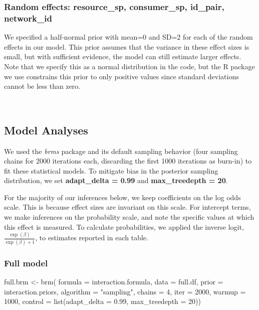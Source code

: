 \documentclass[11pt,]{article}
\newenvironment{Shaded}{}{}
\newcommand{\KeywordTok}[1]{\textcolor[rgb]{0.00,0.00,1.00}{#1}}
\newcommand{\DataTypeTok}[1]{#1}
\newcommand{\DecValTok}[1]{#1}
\newcommand{\FloatTok}[1]{#1}
\newcommand{\StringTok}[1]{\textcolor[rgb]{0.00,0.50,0.50}{#1}}
\newcommand{\NormalTok}[1]{#1}
\begin{document}
\subsubsection{Random effects: resource\_sp, consumer\_sp, id\_pair,
network\_id}\label{random-effects-resource_sp-consumer_sp-id_pair-network_id}

We specified a half-normal prior with mean=0 and SD=2 for each of the
random effects in our model. This prior assumes that the variance in
these effect sizes is small, but with sufficient evidence, the model can
still estimate larger effects. Note that we specify this as a normal
distribution in the code, but the R package we use constrains this prior
to only positive values since standard deviations cannot be less than
zero.

~

\subsection{Model Analyses}\label{model-analyses}

We used the \emph{brms} package \citep{Burkner2017} and its default
sampling behavior (four sampling chains for 2000 iterations each,
discarding the first 1000 iterations as burn-in) to fit these
statistical models. To mitigate bias in the posterior sampling
distribution, we set \textbf{adapt\_delta = 0.99} and
\textbf{max\_treedepth = 20}.

For the majority of our inferences below, we keep coefficients on the
log odds scale. This is because effect sizes are invariant on this
scale. For intercept terms, we make inferences on the probability scale,
and note the specific values at which this effect is measured. To
calculate probabilities, we applied the inverse logit,
\(\frac{\exp(\beta)}{\exp(\beta)+1}\), to estimates reported in each
table.

\subsubsection{Full model}\label{full-model}

\begin{Shaded}
\begin{Highlighting}[]
\NormalTok{full.brm <-}\StringTok{ }\KeywordTok{brm}\NormalTok{(}
  \DataTypeTok{formula =}\NormalTok{ interaction.formula, }\DataTypeTok{data =}\NormalTok{ full.df, }
  \DataTypeTok{prior =}\NormalTok{ interaction.priors, }\DataTypeTok{algorithm =} \StringTok{"sampling"}\NormalTok{, }
  \DataTypeTok{chains =} \DecValTok{4}\NormalTok{, }\DataTypeTok{iter =} \DecValTok{2000}\NormalTok{, }\DataTypeTok{warmup =} \DecValTok{1000}\NormalTok{, }
  \DataTypeTok{control =} \KeywordTok{list}\NormalTok{(}\DataTypeTok{adapt_delta =} \FloatTok{0.99}\NormalTok{, }\DataTypeTok{max_treedepth =} \DecValTok{20}\NormalTok{))}
\end{Highlighting}
\end{Shaded}
\end{document}
